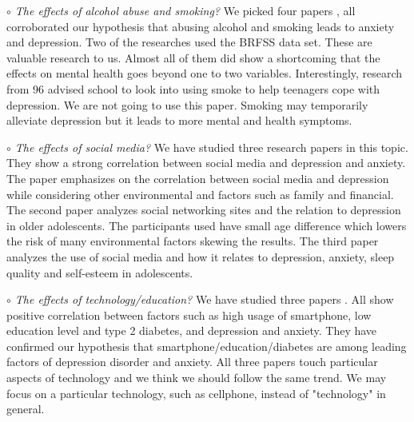 \documentclass[letterpaper, 10 pt, conference]{ieeeconf}  %
\begin{document}
\setlength{\parskip}{1em} %

\par\noindent\textit{$\circ$ The effects of alcohol abuse and smoking?}\newline
We picked four papers \cite{jia2018associations}\cite{strine2008depression}\cite{allan2015effects}\cite{patton1996smoking}
, all corroborated our hypothesis that abusing alcohol and smoking leads to anxiety and depression. Two of the 
researches used the BRFSS data set. These are valuable research to us. Almost all of them did show a shortcoming that 
the effects on mental health goes beyond one to two variables. Interestingly, research \cite{patton1996smoking}  
from 96 advised school to look into using smoke to help teenagers cope with depression. We are not going to use this paper. 
Smoking may temporarily alleviate depression but it leads to more mental and health symptoms. 


\par\noindent\textit{$\circ$ The effects of social media?}\newline
We have studied three research papers in this topic. They show a strong correlation between 
social media and depression and anxiety. The paper \cite{lin2016association} emphasizes on the correlation 
between social media and depression while considering other environmental and factors such as family and financial. 
The second paper \cite{jelenchick2013facebook} analyzes social networking sites and the relation to depression in older 
adolescents. The participants used have small age difference which lowers the risk of many 
environmental factors skewing the results. The third paper \cite{woods2016sleepyteens} analyzes the use of social media 
and how it relates to depression, anxiety, sleep quality and self-esteem in adolescents. 

\par\noindent\textit{$\circ$ The effects of technology/education?}\newline
We have studied three papers \cite{demirci2015relationship}\cite{bjelland2008does}\cite{mezuk2008influence}. All show positive correlation between 
factors such as high usage of smartphone, low education level and type 2 
diabetes, and depression and anxiety. They have confirmed our hypothesis 
that smartphone/education/diabetes are among leading factors of depression 
disorder and anxiety. All three papers touch particular aspects of technology and we think we should follow the same trend.
We may focus on a particular technology, such as cellphone, instead of "technology" in general. 
\end{document}
